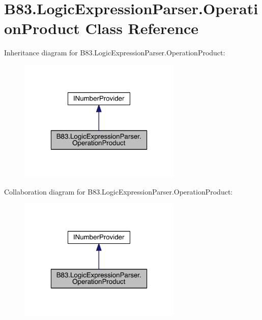 \hypertarget{class_b83_1_1_logic_expression_parser_1_1_operation_product}{}\section{B83.\+Logic\+Expression\+Parser.\+Operation\+Product Class Reference}
\label{class_b83_1_1_logic_expression_parser_1_1_operation_product}


Inheritance diagram for B83.\+Logic\+Expression\+Parser.\+Operation\+Product\+:\nopagebreak
\begin{figure}[H]
\begin{center}
\leavevmode
\includegraphics[width=220pt]{class_b83_1_1_logic_expression_parser_1_1_operation_product__inherit__graph}
\end{center}
\end{figure}


Collaboration diagram for B83.\+Logic\+Expression\+Parser.\+Operation\+Product\+:\nopagebreak
\begin{figure}[H]
\begin{center}
\leavevmode
\includegraphics[width=220pt]{class_b83_1_1_logic_expression_parser_1_1_operation_product__coll__graph}
\end{center}
\end{figure}
